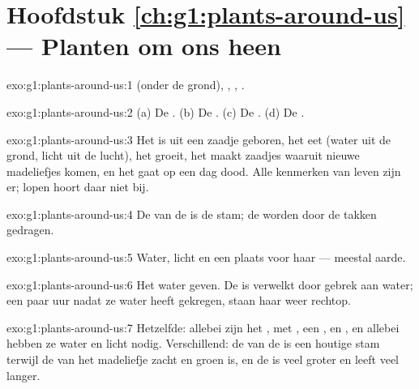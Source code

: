 \section*{Hoofdstuk \ref{ch:g1:plants-around-us} --- Planten om ons heen}

\begin{solution}{exo:g1:plants-around-us:1}
 (onder de grond), , , .
\end{solution}

\begin{solution}{exo:g1:plants-around-us:2}
(a) De . (b) De . (c) De . (d) De .
\end{solution}

\begin{solution}{exo:g1:plants-around-us:3}
Het is uit een zaadje geboren, het eet (water uit de grond, licht uit
de lucht), het groeit, het maakt zaadjes waaruit nieuwe madeliefjes
komen, en het gaat op een dag dood. Alle kenmerken van leven zijn er;
lopen hoort daar niet bij.
\end{solution}

\begin{solution}{exo:g1:plants-around-us:4}
De  van de  is de stam; de  worden door de takken
gedragen.
\end{solution}

\begin{solution}{exo:g1:plants-around-us:5}
Water, licht en een plaats voor haar  --- meestal aarde.
\end{solution}

\begin{solution}{exo:g1:plants-around-us:6}
Het water geven. De  is verwelkt door gebrek aan water; een paar
uur nadat ze water heeft gekregen, staan haar  weer rechtop.
\end{solution}

\begin{solution}{exo:g1:plants-around-us:7}
Hetzelfde: allebei zijn het , met , een , 
en , en allebei hebben ze water en licht nodig. Verschillend: de
 van de  is een houtige stam terwijl de  van het
madeliefje zacht en groen is, en de  is veel groter en leeft veel langer.
\end{solution}

